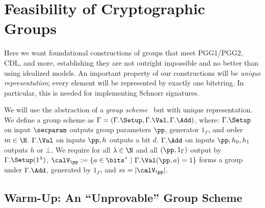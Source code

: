 \iffalse
\section{Feasibility of Cryptographic Groups} \label{sec-feas}

Here  we want foundational constructions of groups  that meet PGG1/PGG2, CDL, and more,  establishing they are not  outright impossible and no better than using idealized models. 
  An important property of our constructions will be \emph{unique representation}; every  element will be represented by exactly one bitstring. In particular, this is needed for implementing Schnorr signatures.
  
We will use the abstraction of a \emph{group scheme}~\cite{PKC:AgrHof18,EC:AgrHofKas20} but with unique representation. We define a group scheme as $\Gamma = (\Gamma.\Setup,\Gamma.\Val,\Gamma.\Add)$, where:   $\Gamma.\Setup$ on input $\secparam$ outputs group parameters $\pp$,  generator $1_\Gamma$, and order $m\in\N$.   $\Gamma.\Val$ on inputs $\pp,h$ outputs a bit $d$.   $\Gamma.\Add$ on inputs $\pp,h_0,h_1$ outputs $h$ or $\bot$.  We require for all $\lambda \in \N$ and all  $(\pp,1_\Gamma)$ output by $\Gamma.\Setup(1^\lambda)$, 
$\calV_{\pp} : = \{a \in \bits^*~|~\Gamma.\Val(\pp,a)=1\}$ forms a group under $\Gamma.\Add$, generated by $1_\Gamma$, and $m = |\calV_\pp|$.


\subsection{Warm-Up: An ``Unprovable'' Group Scheme}


